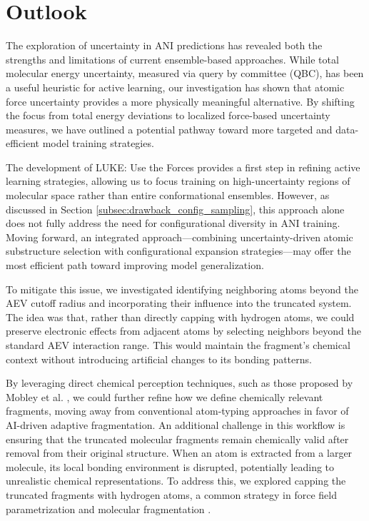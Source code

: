 \section{Outlook}

The exploration of uncertainty in ANI predictions has revealed both the strengths and limitations of current ensemble-based approaches. While total molecular energy uncertainty, measured via query by committee (QBC), has been a useful heuristic for active learning, our investigation has shown that atomic force uncertainty provides a more physically meaningful alternative. By shifting the focus from total energy deviations to localized force-based uncertainty measures, we have outlined a potential pathway toward more targeted and data-efficient model training strategies.

The development of LUKE: Use the Forces provides a first step in refining active learning strategies, allowing us to focus training on high-uncertainty regions of molecular space rather than entire conformational ensembles. However, as discussed in Section \ref{subsec:drawback_config_sampling}, this approach alone does not fully address the need for configurational diversity in ANI training. Moving forward, an integrated approach—combining uncertainty-driven atomic substructure selection with configurational expansion strategies—may offer the most efficient path toward improving model generalization.




To mitigate this issue, we investigated identifying neighboring atoms beyond the AEV cutoff radius and incorporating their influence into the truncated system. The idea was that, rather than directly capping with hydrogen atoms, we could preserve electronic effects from adjacent atoms by selecting neighbors beyond the standard AEV interaction range. This would maintain the fragment’s chemical context without introducing artificial changes to its bonding patterns.



By leveraging direct chemical perception techniques, such as those proposed by Mobley et al. \cite{direct_chem_perception_mobley}, we could further refine how we define chemically relevant fragments, moving away from conventional atom-typing approaches in favor of AI-driven adaptive fragmentation. An additional challenge in this workflow is ensuring that the truncated molecular fragments remain chemically valid after removal from their original structure. When an atom is extracted from a larger molecule, its local bonding environment is disrupted, potentially leading to unrealistic chemical representations. To address this, we explored capping the truncated fragments with hydrogen atoms, a common strategy in force field parametrization and molecular fragmentation \cite{protein_ff_fragmentation_nn_wang}.


